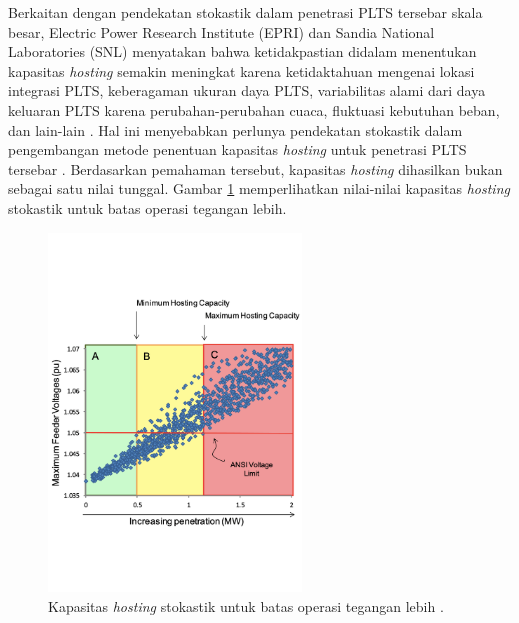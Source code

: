 {{Berkaitan dengan pendekatan stokastik dalam penetrasi PLTS tersebar skala besar, Electric Power Research Institute (EPRI) dan Sandia National Laboratories (SNL) menyatakan bahwa ketidakpastian didalam menentukan kapasitas \textit{hosting} semakin meningkat karena ketidaktahuan mengenai lokasi integrasi PLTS, keberagaman ukuran daya PLTS, variabilitas alami dari daya keluaran PLTS karena perubahan-perubahan cuaca, fluktuasi kebutuhan beban, dan lain-lain \cite{Palmintier2016}. Hal ini menyebabkan perlunya pendekatan stokastik dalam pengembangan metode penentuan kapasitas \textit{hosting} untuk penetrasi PLTS tersebar \cite{Epri2012,Epri2013}. Berdasarkan pemahaman tersebut, kapasitas \textit{hosting} dihasilkan bukan sebagai satu nilai tunggal. Gambar \ref{phcepri} memperlihatkan nilai-nilai kapasitas \textit{hosting} stokastik untuk batas operasi tegangan lebih.
\begin{figure}[!h]
	\vspace*{0pt}
	\centering
	\includegraphics[width=0.6\textwidth]{Fig/phcepri}
	\caption{Kapasitas \textit{hosting} stokastik untuk batas operasi tegangan lebih \cite{Epri2013}.}
	\label{phcepri}
\end{figure}

}}
